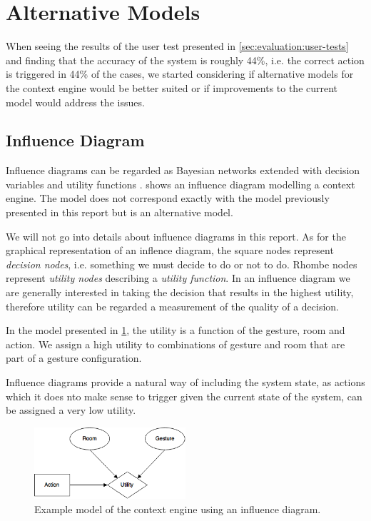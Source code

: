 \section{Alternative Models}
\label{sec:evaluation-alternative-models}

When seeing the results of the user test presented in \cref{sec:evaluation:user-tests} and finding that the accuracy of the system is roughly 44\%, i.e. the correct action is triggered in 44\% of the cases, we started considering if alternative models for the context engine would be better suited or if improvements to the current model would address the issues.

\subsection{Influence Diagram}

Influence diagrams can be regarded as Bayesian networks extended with decision variables and utility functions \cite{kjaerulff2008bayesian}.  shows an influence diagram modelling a context engine. The model does not correspond exactly with the model previously presented in this report but is an alternative model.

We will not go into details about influence diagrams in this report. As for the graphical representation of an inflence diagram, the square nodes represent \emph{decision nodes}, i.e. something we must decide to do or not to do. Rhombe nodes represent \emph{utility nodes} describing a \emph{utility function}. In an influence diagram we are generally interested in taking the decision that results in the highest utility, therefore utility can be regarded a measurement of the quality of a decision.

In the model presented in \cref{fig:evaluation:alternative-models:influence-diagram}, the utility is a function of the gesture, room and action. We assign a high utility to combinations of gesture and room that are part of a gesture configuration. 

Influence diagrams provide a natural way of including the system state, as actions which it does nto make sense to trigger given the current state of the system, can be assigned a very low utility.

\begin{figure}[!h]
\centering
\includegraphics[width=0.50\textwidth]{images/influence-diagram}
\caption{Example model of the context engine using an influence diagram.}
\label{fig:evaluation:alternative-models:influence-diagram}
\end{figure}

